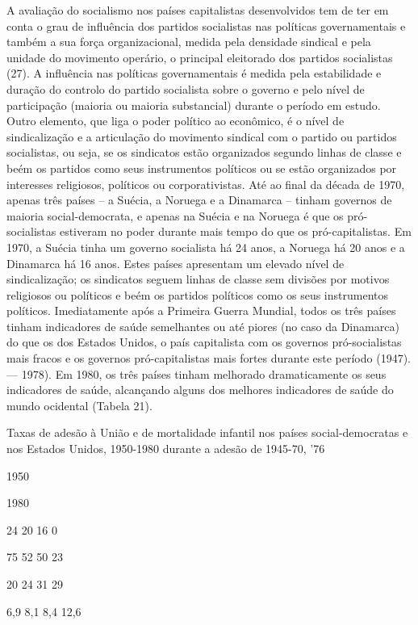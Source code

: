\documentclass[twocolumn,amsmath,amssymb,aps,pre,floatfix]{revtex4-2}
\begin{document}
\par
A avaliação do socialismo nos países capitalistas desenvolvidos tem de ter em conta o grau de influência dos partidos socialistas nas políticas governamentais e também a sua força organizacional, medida pela densidade sindical e pela unidade do movimento operário, o principal eleitorado dos partidos socialistas (27). A influência nas políticas governamentais é medida pela estabilidade e duração do controlo do partido socialista sobre o governo e pelo nível de participação (maioria ou maioria substancial) durante o período em estudo. Outro elemento, que liga o poder político ao econômico, é o nível de sindicalização e a articulação do movimento sindical com o partido ou partidos socialistas, ou seja, se os sindicatos estão organizados segundo linhas de classe e beém os partidos como seus instrumentos políticos ou se estão organizados por interesses religiosos, políticos ou corporativistas. Até ao final da década de 1970, apenas três países – a Suécia, a Noruega e a Dinamarca – tinham governos de maioria social-democrata, e apenas na Suécia e na Noruega é que os pró-socialistas estiveram no poder durante mais tempo do que os pró-capitalistas. Em 1970, a Suécia tinha um governo socialista há 24 anos, a Noruega há 20 anos e a Dinamarca há 16 anos. Estes países apresentam um elevado nível de sindicalização; os sindicatos seguem linhas de classe sem divisões por motivos religiosos ou políticos e beém os partidos políticos como os seus instrumentos políticos. Imediatamente após a Primeira Guerra Mundial, todos os três países tinham indicadores de saúde semelhantes ou até piores (no caso da Dinamarca) do que os dos Estados Unidos, o país capitalista com os governos pró-socialistas mais fracos e os governos pró-capitalistas mais fortes durante este período (1947). — 1978). Em 1980, os três países tinham melhorado dramaticamente os seus indicadores de saúde, alcançando alguns dos melhores indicadores de saúde do mundo ocidental (Tabela 21).
\par
Taxas de adesão à União e de mortalidade infantil nos países social-democratas e nos Estados Unidos, 1950-1980 durante a adesão de 1945-70, '76
\par
1950
\par
1980
\par
24 20 16 0
\par
75 52 50 23
\par
20 24 31 29
\par
6,9 8,1 8,4 12,6
\par
\end{document}
